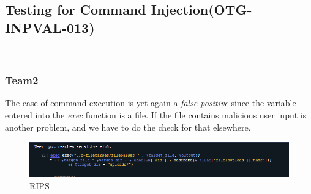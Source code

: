 \documentclass[headsepline,footsepline,footinclude=false,oneside,fontsize=11pt,paper=a4,listof=totoc,bibliography=totoc]{scrbook} %
\begin{document}
\subsection{Testing for Command Injection(OTG-INPVAL-013)}\
\subsubsection{Team2}
The case of command execution is yet again a \textit{false-positive} since the variable entered into the \textit{exec} function is a file. If the file contains malicious user input is another problem, and we have to do the check for that elsewhere.\\

\begin{figure}[H]
	\centering
	\includegraphics[width=170mm]{logos/command1.jpg}
	\caption{RIPS \label{overflow}}
\end{figure}
 
\pagebreak
\end{document}
